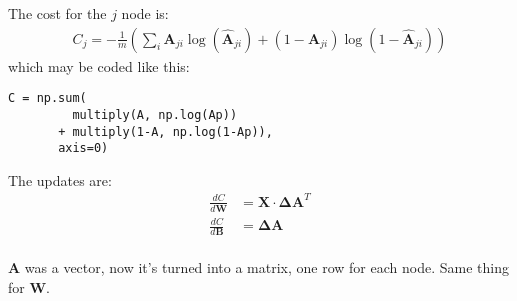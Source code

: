 The cost for the $j$ node is:
\begin{align}
  C_j = -\frac{1}{m}\left(\sum_i \mathbf{A}_{ji}\log(\hat{\mathbf{A}}_{ji}) + (1-\mathbf{A}_{ji})\log(1-\hat{\mathbf{A}}_{ji})\right) 
\end{align}
which may be coded like this:
\begin{verbatim}
C = np.sum(
         multiply(A, np.log(Ap))
       + multiply(1-A, np.log(1-Ap)),
       axis=0)
\end{verbatim}
The updates are: 
\begin{align}
  \frac{dC}{d\mathbf{W}} &= \mathbf{X}\cdot{}\mathbf{\Delta A}^T\\
  \frac{dC}{d\mathbf{B}} &= \mathbf{\Delta A}\\
\end{align}

$\mathbf{A}$ was a vector, now it's turned into a matrix, one row for each node. Same thing for $\mathbf{W}$.
